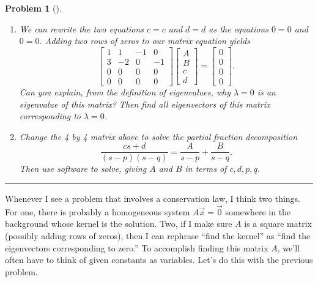 \documentclass[letterpaper,oneside]{book}%
\theoremstyle{plain}
\theoremstyle{box}
\theoremstyle{problem}
\newtheorem{problemnum}{Problem}[chapter]
\newenvironment{problem}[1][]{\begin{problemnum}[#1]}{\end{problemnum}\nopagebreak\hrule\bigskip}
\newcommand{\bvec}[1]{\begin{bmatrix} #1 \end{bmatrix}}
\begin{document}
\begin{problem}
\begin{enumerate}
\item 
We can rewrite the two equations $c=c$ and $d=d$ as the equations $0=0$ and $0=0$. Adding two rows of zeros to our matrix equation yields
$$\bvec{
1 & 1 & -1& 0 \\
3 &-2 & 0 & -1\\
0 & 0 & 0 & 0\\
0 & 0 & 0 & 0
}\bvec{A\\B\\c\\d}=\bvec{0\\0\\0\\0}.$$
Can you explain, from the definition of eigenvalues, why $\lambda =0$ is an eigenvalue of this matrix? Then find all eigenvectors of this matrix corresponding to $\lambda=0$.

\item 
Change the 4 by 4 matrix above to solve the partial fraction decomposition
$$
\frac{cs+d}{(s-p)(s-q)} = \frac{A}{s-p}+\frac{B}{s-q}.
$$
Then use software to solve, giving $A$ and $B$ in terms of $c,d,p,q$. %
\end{enumerate}
\end{problem}




Whenever I see a problem that involves a conservation law, I think two things. For one, there is probably a homogeneous system $A\vec x = \vec 0$ somewhere in the background whose kernel is the solution. Two, if I make sure $A$ is a square matrix (possibly adding rows of zeros), then I can rephrase ``find the kernel'' as ``find the eigenvectors corresponding to zero.'' To accomplish finding this matrix $A$, we'll often have to think of given constants as variables.  Let's do this with the previous problem. 
\end{document}
